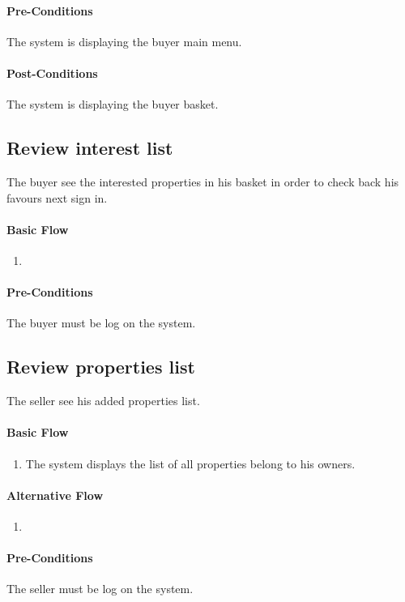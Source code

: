 \documentclass[a4paper,12pt]{article}
\begin{document}
\paragraph{Pre-Conditions}
The system is displaying the buyer main menu.
\paragraph{Post-Conditions}
The system is displaying the buyer basket.

\subsection{Review interest list}

The buyer see the interested properties in his basket in order to check back his favours next sign in.

\paragraph{Basic Flow}
\begin{enumerate}
\item
\end{enumerate}
\paragraph{Pre-Conditions}
The buyer must be log on the system.


\subsection{Review properties list}

The seller see his added properties list.

\paragraph{Basic Flow}
\begin{enumerate}
\item The system displays the list of all properties belong to his owners.
\end{enumerate}
\paragraph{Alternative Flow}
\begin{enumerate}
\item
\end{enumerate}
\paragraph{Pre-Conditions}
The seller must be log on the system.
\end{document}
